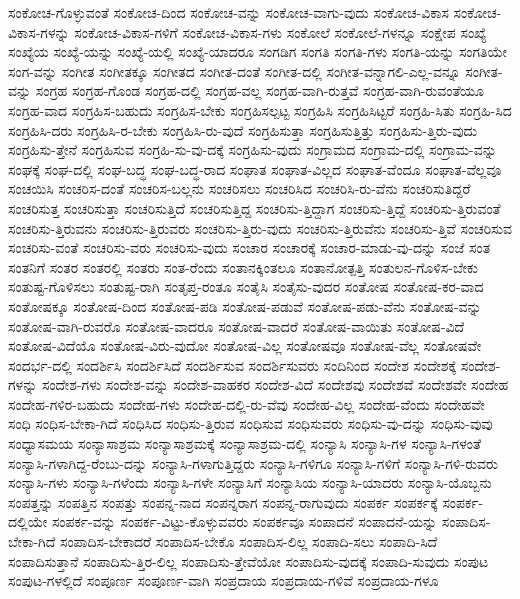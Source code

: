 {ಸಂಕೋಚ-ಗೊಳ್ಳುವಂತೆ
ಸಂಕೋಚ-ದಿಂದ
ಸಂಕೋಚ-ವನ್ನು
ಸಂಕೋಚ-ವಾಗು-ವುದು
ಸಂಕೋಚ-ವಿಕಾಸ
ಸಂಕೋಚ-ವಿಕಾಸ-ಗಳನ್ನು
ಸಂಕೋಚ-ವಿಕಾಸ-ಗಳಿಗೆ
ಸಂಕೋಚ-ವಿಕಾಸ-ಗಳು
ಸಂಕೋಲೆ
ಸಂಕೋಲೆ-ಗಳನ್ನೂ
ಸಂಕ್ಷೇಪ
ಸಂಖ್ಯೆ
ಸಂಖ್ಯೆಯ
ಸಂಖ್ಯೆ-ಯನ್ನು
ಸಂಖ್ಯೆ-ಯಲ್ಲಿ
ಸಂಖ್ಯೆ-ಯಾದರೂ
ಸಂಗಡಿಗ
ಸಂಗತಿ
ಸಂಗತಿ-ಗಳು
ಸಂಗತಿ-ಯನ್ನು
ಸಂಗತಿಯೇ
ಸಂಗ-ವನ್ನು
ಸಂಗೀತ
ಸಂಗೀತಕ್ಕೂ
ಸಂಗೀತದ
ಸಂಗೀತ-ದಂತೆ
ಸಂಗೀತ-ದಲ್ಲಿ
ಸಂಗೀತ-ವನ್ನಾಗಲಿ-ಎಲ್ಲ-ವನ್ನೂ
ಸಂಗೀತ-ವನ್ನು
ಸಂಗ್ರಹ
ಸಂಗ್ರಹ-ಗೊಂಡ
ಸಂಗ್ರಹ-ದಲ್ಲಿ
ಸಂಗ್ರಹ-ವಲ್ಲ
ಸಂಗ್ರಹ-ವಾಗಿ-ರುತ್ತವೆ
ಸಂಗ್ರಹ-ವಾಗಿ-ರುವಂತೆಯೂ
ಸಂಗ್ರಹ-ವಾದ
ಸಂಗ್ರಹಿಸ-ಬಹುದು
ಸಂಗ್ರಹಿಸ-ಬೇಕು
ಸಂಗ್ರಹಿಸಲ್ಪಟ್ಟ
ಸಂಗ್ರಹಿಸಿ
ಸಂಗ್ರಹಿಸಿಟ್ಟರೆ
ಸಂಗ್ರಹಿ-ಸಿತು
ಸಂಗ್ರಹಿ-ಸಿದ
ಸಂಗ್ರಹಿಸಿ-ದರು
ಸಂಗ್ರಹಿಸಿ-ರ-ಬೇಕು
ಸಂಗ್ರಹಿಸಿ-ರು-ವುದೆ
ಸಂಗ್ರಹಿಸುತ್ತಾ
ಸಂಗ್ರಹಿಸುತ್ತಿತ್ತು
ಸಂಗ್ರಹಿಸು-ತ್ತಿರು-ವುದು
ಸಂಗ್ರಹಿಸು-ತ್ತೇನೆ
ಸಂಗ್ರಹಿಸುವ
ಸಂಗ್ರಹಿ-ಸು-ವು-ದಕ್ಕೆ
ಸಂಗ್ರಹಿಸು-ವುದು
ಸಂಗ್ರಾಮದ
ಸಂಗ್ರಾಮ-ದಲ್ಲಿ
ಸಂಗ್ರಾಮ-ವನ್ನು
ಸಂಘಕ್ಕೆ
ಸಂಘ-ದಲ್ಲಿ
ಸಂಘ-ಬದ್ಧ
ಸಂಘ-ಬದ್ಧ-ರಾದ
ಸಂಘಾತ
ಸಂಘಾತ-ವಿಲ್ಲದ
ಸಂಘಾತ-ವೆಂದೂ
ಸಂಘಾತ-ವೆಲ್ಲವೂ
ಸಂಚಯಿಸಿ
ಸಂಚರಿಸ-ದಂತೆ
ಸಂಚರಿಸ-ಬಲ್ಲನು
ಸಂಚರಿಸಲು
ಸಂಚರಿಸಿದ
ಸಂಚರಿಸಿ-ರು-ವೆನು
ಸಂಚರಿಸುತಿದ್ದರೆ
ಸಂಚರಿಸುತ್ತ
ಸಂಚರಿಸುತ್ತಾ
ಸಂಚರಿಸುತ್ತಿದೆ
ಸಂಚರಿಸುತ್ತಿದ್ದ
ಸಂಚರಿಸು-ತ್ತಿದ್ದಾಗ
ಸಂಚರಿಸು-ತ್ತಿದ್ದೆ
ಸಂಚರಿಸು-ತ್ತಿರುವಂತೆ
ಸಂಚರಿಸು-ತ್ತಿರುವನು
ಸಂಚರಿಸು-ತ್ತಿರುವರು
ಸಂಚರಿಸು-ತ್ತಿರು-ವುದು
ಸಂಚರಿಸು-ತ್ತಿರುವೆನು
ಸಂಚರಿಸು-ತ್ತಿವೆ
ಸಂಚರಿಸುವ
ಸಂಚರಿಸು-ವಂತೆ
ಸಂಚರಿಸು-ವರು
ಸಂಚರಿಸು-ವುದು
ಸಂಚಾರ
ಸಂಚಾರಕ್ಕೆ
ಸಂಚಾರ-ಮಾಡು-ವು-ದನ್ನು
ಸಂಜೆ
ಸಂತ
ಸಂತನಿಗೆ
ಸಂತರ
ಸಂತರಲ್ಲಿ
ಸಂತರು
ಸಂತ-ರೆಂದು
ಸಂತಾನಕ್ಕಿಂತಲೂ
ಸಂತಾನೋತ್ಪತ್ತಿ
ಸಂತುಲನ-ಗೊಳಿಸ-ಬೇಕು
ಸಂತುಷ್ಟ-ಗೊಳಿಸಲು
ಸಂತುಷ್ಟ-ರಾಗಿ
ಸಂತೃಪ್ತ-ರಂತೂ
ಸಂತೈಸಿ
ಸಂತೈಸು-ವುದರ
ಸಂತೋಷ
ಸಂತೋಷ-ಕರ-ವಾದ
ಸಂತೋಷಕ್ಕೂ
ಸಂತೋಷ-ದಿಂದ
ಸಂತೋಷ-ಪಡಿ
ಸಂತೋಷ-ಪಡುವೆ
ಸಂತೋಷ-ಪಡು-ವೆನು
ಸಂತೋಷ-ವನ್ನು
ಸಂತೋಷ-ವಾಗಿ-ರುವರೊ
ಸಂತೋಷ-ವಾದರೂ
ಸಂತೋಷ-ವಾದರೆ
ಸಂತೋಷ-ವಾಯಿತು
ಸಂತೋಷ-ವಿದೆ
ಸಂತೋಷ-ವಿದೆಯೊ
ಸಂತೋಷ-ವಿರು-ವುದೋ
ಸಂತೋಷ-ವಿಲ್ಲ
ಸಂತೋಷವೂ
ಸಂತೋಷ-ವೆಲ್ಲ
ಸಂತೋಷವೇ
ಸಂದರ್ಭ-ದಲ್ಲಿ
ಸಂದರ್ಶಿಸಿ
ಸಂದರ್ಶಿಸಿದೆ
ಸಂದರ್ಶಿಸುವ
ಸಂದರ್ಶಿಸುವರು
ಸಂದಿನಿಂದ
ಸಂದೇಶ
ಸಂದೇಶಕ್ಕೆ
ಸಂದೇಶ-ಗಳನ್ನು
ಸಂದೇಶ-ಗಳು
ಸಂದೇಶ-ವನ್ನು
ಸಂದೇಶ-ವಾಹಕರ
ಸಂದೇಶ-ವಿದೆ
ಸಂದೇಶವು
ಸಂದೇಶವೆ
ಸಂದೇಶವೇ
ಸಂದೇಹ
ಸಂದೇಹ-ಗಳಿರ-ಬಹುದು
ಸಂದೇಹ-ಗಳು
ಸಂದೇಹ-ದಲ್ಲಿ-ರು-ವೆವು
ಸಂದೇಹ-ವಿಲ್ಲ
ಸಂದೇಹ-ವೆಂದು
ಸಂದೇಹವೇ
ಸಂಧಿ
ಸಂಧಿಸ-ಬೇಕಾ-ಗಿದೆ
ಸಂಧಿಸಿದ
ಸಂಧಿಸು-ತ್ತಿರುವ
ಸಂಧಿಸುವ
ಸಂಧಿಸುವರು
ಸಂಧಿಸು-ವು-ದನ್ನು
ಸಂಧಿಸು-ವುವು
ಸಂಧ್ಯಾಸಮಯ
ಸಂನ್ಯಾಸಾಶ್ರಮ
ಸಂನ್ಯಾಸಾಶ್ರಮಕ್ಕೆ
ಸಂನ್ಯಾಸಾಶ್ರಮ-ದಲ್ಲಿ
ಸಂನ್ಯಾಸಿ
ಸಂನ್ಯಾಸಿ-ಗಳ
ಸಂನ್ಯಾಸಿ-ಗಳಂತೆ
ಸಂನ್ಯಾಸಿ-ಗಳಾಗಿದ್ದ-ರೆಂಬು-ದನ್ನು
ಸಂನ್ಯಾಸಿ-ಗಳಾಗುತ್ತಿದ್ದರು
ಸಂನ್ಯಾಸಿ-ಗಳಿಗೂ
ಸಂನ್ಯಾಸಿ-ಗಳಿಗೆ
ಸಂನ್ಯಾಸಿ-ಗಳಿ-ರುವರು
ಸಂನ್ಯಾಸಿ-ಗಳು
ಸಂನ್ಯಾಸಿ-ಗಳೆಂದು
ಸಂನ್ಯಾಸಿ-ಗಳೇ
ಸಂನ್ಯಾಸಿಗೆ
ಸಂನ್ಯಾಸಿಯ
ಸಂನ್ಯಾಸಿ-ಯಾದರು
ಸಂನ್ಯಾಸಿ-ಯೊಬ್ಬನು
ಸಂಪತ್ತನ್ನು
ಸಂಪತ್ತಿನ
ಸಂಪತ್ತು
ಸಂಪನ್ನ-ನಾದ
ಸಂಪನ್ನರಾಗ
ಸಂಪನ್ನ-ರಾಗುವುದು
ಸಂಪರ್ಕ
ಸಂಪರ್ಕಕ್ಕೆ
ಸಂಪರ್ಕ-ದಲ್ಲಿಯೇ
ಸಂಪರ್ಕ-ವನ್ನು
ಸಂಪರ್ಕ-ವಿಟ್ಟು-ಕೊಳ್ಳುವವರು
ಸಂಪರ್ಕವೂ
ಸಂಪಾದನೆ
ಸಂಪಾದನೆ-ಯನ್ನು
ಸಂಪಾದಿಸ-ಬೇಕಾ-ಗಿದೆ
ಸಂಪಾದಿಸ-ಬೇಕಾದರೆ
ಸಂಪಾದಿಸ-ಬೇಕೊ
ಸಂಪಾದಿಸ-ಲಿಲ್ಲ
ಸಂಪಾದಿ-ಸಲು
ಸಂಪಾದಿ-ಸಿದೆ
ಸಂಪಾದಿಸುತ್ತಾನೆ
ಸಂಪಾದಿಸು-ತ್ತಿರ-ಲಿಲ್ಲ
ಸಂಪಾದಿಸು-ತ್ತೇವೆಯೋ
ಸಂಪಾದಿಸು-ವುದಕ್ಕೆ
ಸಂಪಾದಿ-ಸುವುದು
ಸಂಪುಟ
ಸಂಪುಟ-ಗಳಲ್ಲಿದೆ
ಸಂಪೂರ್ಣ
ಸಂಪೂರ್ಣ-ವಾಗಿ
ಸಂಪ್ರದಾಯ
ಸಂಪ್ರದಾಯ-ಗಳಿವೆ
ಸಂಪ್ರದಾಯ-ಗಳೂ
}
